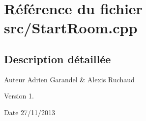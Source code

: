 \section{Référence du fichier src/\-Start\-Room.cpp}
\label{_start_room_8cpp}


\subsection{Description détaillée}
\begin{DoxyAuthor}{Auteur}
Adrien Garandel \& Alexis Ruchaud 
\end{DoxyAuthor}
\begin{DoxyVersion}{Version}
1. 
\end{DoxyVersion}
\begin{DoxyDate}{Date}
27/11/2013 
\end{DoxyDate}
